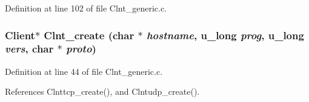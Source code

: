 Definition at line 102 of file Clnt\_\-generic.c.
\subsubsection{\setlength{\rightskip}{0pt plus 5cm}Client$\ast$ Clnt\_\-create (char $\ast$ {\em hostname}, u\_\-long {\em prog}, u\_\-long {\em vers}, char $\ast$ {\em proto})}\label{Clnt__generic_8c_a0}




Definition at line 44 of file Clnt\_\-generic.c.

References Clnttcp\_\-create(), and Clntudp\_\-create().